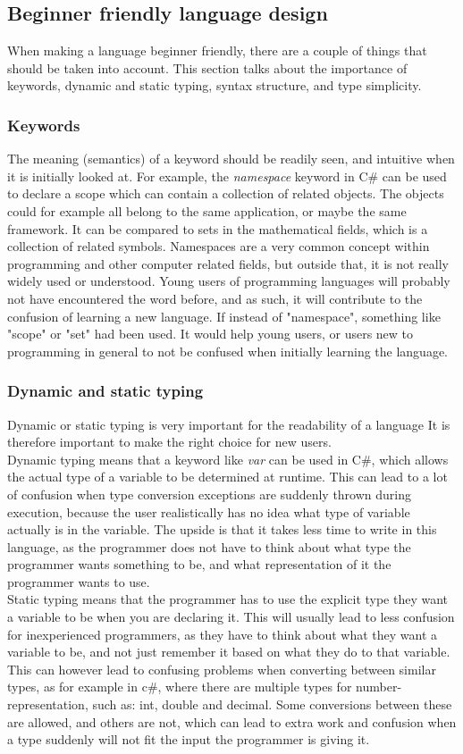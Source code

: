 \subsection{Beginner friendly language design}
When making a language beginner friendly, there are a couple of things that should be taken into account. This section talks about the importance of keywords, dynamic and static typing, syntax structure, and type simplicity.
\subsubsection{Keywords}
The meaning (semantics) of a keyword should be readily seen, and intuitive when it is initially looked at. For example, the \textit{namespace} keyword in C\# can be used to declare a scope which can contain a collection of related objects. The objects could for example all belong to the same application, or maybe the same framework. It can be compared to sets in the mathematical fields, which is a collection of related symbols. Namespaces are a very common concept within programming and other computer related fields, but outside that, it is not really widely used or understood. Young users of programming languages will probably not have encountered the word before, and as such, it will contribute to the confusion of learning a new language. If instead of "namespace", something like "scope" or "set" had been used. It would help young users, or users new to programming in general to not be confused when initially learning the language.


\subsubsection{Dynamic and static typing}
Dynamic or static typing is very important for the readability of a language It is therefore important to make the right choice for new users. 
\\Dynamic typing means that a keyword like \textit{var} can be used in C\#, which allows the actual type of a variable to be determined at runtime. This can lead to a lot of confusion when type conversion exceptions are suddenly thrown during execution, because the user realistically has no idea what type of variable actually is in the variable. The upside is that it takes less time to write in this language, as the programmer does not have to think about what type the programmer wants something to be, and what representation of it the programmer wants to use. 
\\Static typing means that the programmer has to use the explicit type they want a variable to be when you are declaring it. This will usually lead to less confusion for inexperienced programmers, as they have to think about what they want a variable to be, and not just remember it based on what they do to that variable. This can however lead to confusing problems when converting between similar types, as for example in c\#, where there are multiple types for number-representation, such as: int, double and decimal. Some conversions between these are allowed, and others are not, which can lead to extra work and confusion when a type suddenly will not fit the input the programmer is giving it.

